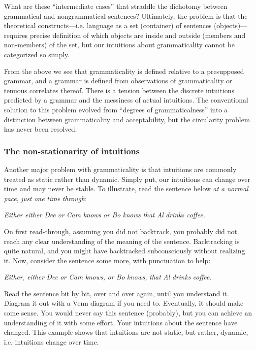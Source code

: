   What are these “intermediate cases” that straddle the dichotomy between grammatical and nongrammatical sentences? Ultimately, the problem is that the theoretical constructs—i.e. language as a set (container) of sentences (objects)—requires precise definition of which objects are inside and outside (members and non-members) of the set, but our intuitions about grammaticality cannot be categorized so simply.

  From the above we see that grammaticality is defined relative to a presupposed grammar, and a grammar is defined from observations of grammaticality or tenuous correlates thereof. There is a tension between the discrete intuitions predicted by a grammar and the messiness of actual intuitions. The conventional solution to this problem evolved from “degrees of grammaticalness” into a distinction between grammaticality and acceptability, but the circularity problem has never been resolved. 

\subsubsection{The non-stationarity of intuitions}

Another major problem with grammaticality is that intuitions are commonly treated as static rather than dynamic. Simply put, our intuitions can change over time and may never be stable. To illustrate, read the sentence below \textit{at} \textit{a} \textit{normal} \textit{pace}, \textit{just} \textit{one} \textit{time} \textit{through}:

    \textit{Either} \textit{either} \textit{Dee} \textit{or} \textit{Cam} \textit{knows} \textit{or} \textit{Bo} \textit{knows} \textit{that} \textit{Al} \textit{drinks} \textit{coffee.}

On first read-through, assuming you did not backtrack, you probably did not reach any clear understanding of the meaning of the sentence. Backtracking is quite natural, and you might have backtracked subconsciously without realizing it. Now, consider the sentence some more, with punctuation to help:

    \textit{Either,} \textit{either} \textit{Dee} \textit{or} \textit{Cam} \textit{knows,} \textit{or} \textit{Bo} \textit{knows,} \textit{that} \textit{Al} \textit{drinks} \textit{coffee.}

  Read the sentence bit by bit, over and over again, until you understand it. Diagram it out with a Venn diagram if you need to. Eventually, it should make some sense. You would never say this sentence (probably), but you can achieve an understanding of it with some effort. Your intuitions about the sentence have changed. This example shows that intuitions are not static, but rather, dynamic, i.e. intuitions change over time.


